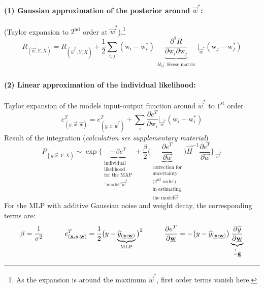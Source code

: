 \paragraph{(1) Gaussian approximation of the posterior around $\vec{w}^*$:}
(Taylor expansion to $2^\mathrm{nd}$ order at
$\vec{w}^*$).\footnote{As the expansion is around the maximum
  $\vec{w}^*$, first order terms vanish here.}
\begin{equation}
	R_{(\vec{w}, Y, X)} = R_{(\vec{w}^*, Y, X)} + \frac{1}{2} 
		\sum\limits_{i,j} (\mathrm{w}_i - \mathrm{w}_i^*)
		\underbrace{ \frac{\partial^2 R}{\partial \mathrm{w}_i
			\partial \mathrm{w}_j} }_{
				\substack{ H_{ij} \text{: Hesse matrix}} }
		\bigg|_{\vec{w}^*} (\mathrm{w}_j - \mathrm{w}_j^*)
\end{equation}
\paragraph{(2) Linear approximation of the individual likelihood:}
Taylor expansion of the models input-output function around
$\vec{w}^*$ to $1^{\mathrm{st}}$ order
\begin{equation}
	e_{(y,\vec{x};\vec{w})}^T = e_{(y,x;\vec{w}^*)}^T 
	+ \sum\limits_i \frac{\partial e^T}{\partial \mathrm{w}_i} 
	\bigg|_{\vec{w}^*} (\mathrm{w}_i - \mathrm{w}_i^*)
\end{equation}
Result of the integration ({\it calculation see supplementary material})
\begin{equation}\label{eqn:predictiveDistributionAGN}
	P_{(y|\vec{x};Y,X)} \sim \exp \Bigg\{
		\underbrace{ -\beta e^T }_{ \substack{
			\text{individual} \\
			\text{likelihood} \\
			\text{for the MAP} \\
			\text{''model''} \vec{w}^*}}
		+ \frac{\beta}{2} \bigg( \underbrace{ 
			\frac{\partial e^T}{\partial \vec{w}} }_{
			\substack{ 	\text{correction for} \\
					\text{uncertainty} \\
					\text{(}2^{\mathrm{nd}}
					\text{ order)} \\
					\text{in estimating} \\
					\text{the model} \vec{w} }} \bigg)
		\vec{H}^{-1} \frac{\partial e^T}{\partial \vec{w}} \Bigg\}
		\Bigg|_{\vec{w}^*}
\end{equation}
For the MLP with additive Gaussian noise and weight decay, the corresponding terms are:
\begin{equation*}
	\beta = \frac{1}{\sigma^2}
\qquad \quad
	e_{(\underline{\mathbf{x}},y;\underline{\mathbf{w}})}^T = \frac{1}{2} \big( y - 
		\underbrace{ \widehat{y}_{(\underline{\mathbf{x}};\underline{\mathbf{w}})} }_{ 
			\substack{ \text{MLP}}}
		\big)^2
\qquad \quad
	\frac{\partial e^T}{\partial \underline{\mathbf{w}}} = -\big( y - 
		\widehat{y}_{(\underline{\mathbf{x}};\underline{\mathbf{w}})} \big) 
	\underbrace{ \frac{\partial \widehat{y}}{\partial \underline{\mathbf{w}}} }_{
		\stackrel{\mathrm{!}}{=} \underline{\mathbf{g}}}
\end{equation*}
